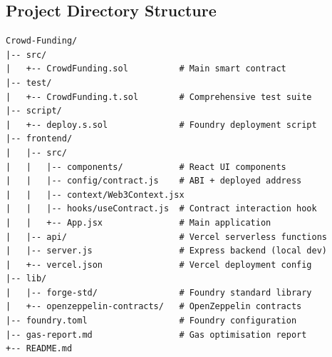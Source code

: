 \subsection{Project Directory Structure}

\begin{lstlisting}[language={}, caption={Project Structure}, label={lst:structure}]
Crowd-Funding/
|-- src/
|   +-- CrowdFunding.sol          # Main smart contract
|-- test/
|   +-- CrowdFunding.t.sol        # Comprehensive test suite
|-- script/
|   +-- deploy.s.sol              # Foundry deployment script
|-- frontend/
|   |-- src/
|   |   |-- components/           # React UI components
|   |   |-- config/contract.js    # ABI + deployed address
|   |   |-- context/Web3Context.jsx
|   |   |-- hooks/useContract.js  # Contract interaction hook
|   |   +-- App.jsx               # Main application
|   |-- api/                      # Vercel serverless functions
|   |-- server.js                 # Express backend (local dev)
|   +-- vercel.json               # Vercel deployment config
|-- lib/
|   |-- forge-std/                # Foundry standard library
|   +-- openzeppelin-contracts/   # OpenZeppelin contracts
|-- foundry.toml                  # Foundry configuration
|-- gas-report.md                 # Gas optimisation report
+-- README.md
\end{lstlisting}
